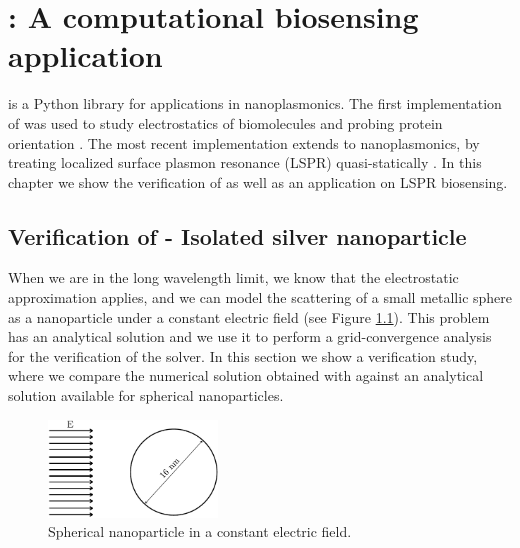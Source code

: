\chapter{\pygbelspr: A computational biosensing application} \label{chap:pygbe-lspr}
\graphicspath{{pygbe_lspr_bio/figs/}}

\pygbelspr \cite{ClementiETal2017} is a Python library for applications in 
nanoplasmonics. The first implementation of \pygbe \cite{CooperETal2016} was used to study electrostatics 
of biomolecules \cite{CooperBardhanBarba2013} and probing protein orientation \cite{CooperClementiBarba2015}. The 
most recent implementation extends \pygbe to nanoplasmonics, by treating localized surface plasmon resonance (LSPR) 
quasi-statically \cite{MayergoyzZhang2007}. In this chapter we show the verification of \pygbelspr as well as an 
application on LSPR biosensing. 

\section{Verification of \pygbe - Isolated silver nanoparticle } \label{sec:verification}

When we are in the long wavelength limit, we know that the electrostatic approximation 
applies, and we can model the scattering of a small metallic sphere as a nanoparticle 
under a constant electric field (see Figure \ref{fig:sph_field}). This problem 
has an analytical solution and we use it to perform a grid-convergence analysis for 
the verification of the \pygbe solver. In this section we show a verification study, where 
we compare the numerical solution obtained with \pygbe against an analytical solution available 
for spherical nanoparticles. 

\begin{figure}[h] %
    \centering
    \includegraphics[width=0.40\textwidth]{sphere_field_8nm.pdf} 
    \caption{Spherical nanoparticle in a constant electric field.}
    \label{fig:sph_field}
\end{figure}

